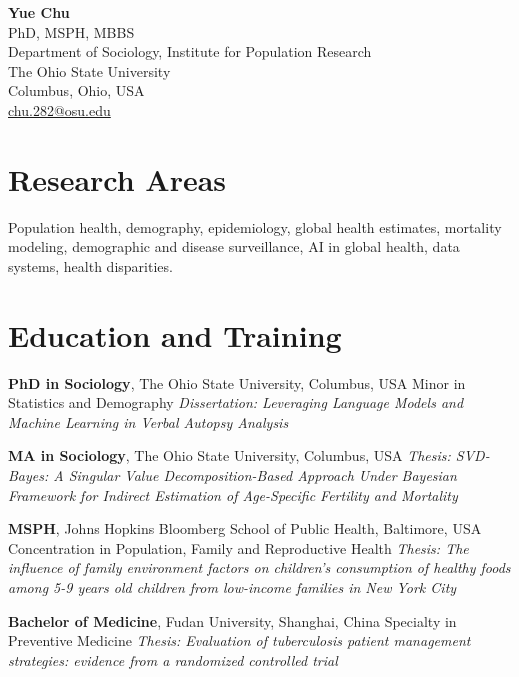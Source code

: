 \documentclass[
  11pt,
  letterpaper,
]{article}
\author{}
\date{}
\newlength{\cvdatewidth}
\newcommand{\cventry}[2]{%
  \noindent
  \makebox[\cvdatewidth][l]{\color{cvmuted}\small #1}%
  \hspace{0.9em}%
  \parbox[t]{\dimexpr\linewidth-\cvdatewidth-0.9em\relax}{#2}%
  \par\vspace{0.5em}
}
\newcommand{\cvname}[1]{{\fontsize{24}{26}\selectfont\bfseries #1}}
\begin{document}
\cvname{Yue Chu}\\[0.18em]
{\normalsize PhD, MSPH, MBBS}\\[0.5em]
Department of Sociology, Institute for Population Research \\
The Ohio State University\\
Columbus, Ohio, USA\\
\href{mailto:chu.282@osu.edu}{chu.282@osu.edu}

\vspace{0.75em}

\section{Research Areas}\label{research-areas}

Population health, demography, epidemiology, global health estimates,
mortality modeling, demographic and disease surveillance, AI in global
health, data systems, health disparities.

\section{Education and Training}\label{education-and-training}

\cventry{2025}{\textbf{PhD in Sociology}, The Ohio State University, Columbus, USA\newline
Minor in Statistics and Demography\newline
\textit{Dissertation: Leveraging Language Models and Machine Learning in Verbal Autopsy Analysis}}
\cventry{2020}{\textbf{MA in Sociology}, The Ohio State University, Columbus, USA\newline
\textit{Thesis: SVD-Bayes: A Singular Value Decomposition-Based Approach Under Bayesian Framework for Indirect Estimation of Age-Specific Fertility and Mortality}}
\cventry{2014}{\textbf{MSPH}, Johns Hopkins Bloomberg School of Public Health, Baltimore, USA\newline
Concentration in Population, Family and Reproductive Health\newline
\textit{Thesis: The influence of family environment factors on children's consumption of healthy foods among 5-9 years old children from low-income families in New York City}}
\cventry{2012}{\textbf{Bachelor of Medicine}, Fudan University, Shanghai, China\newline
Specialty in Preventive Medicine\newline
\textit{Thesis: Evaluation of tuberculosis patient management strategies: evidence from a randomized controlled trial}}
\end{document}
